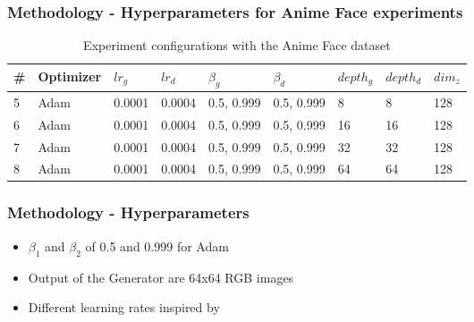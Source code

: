 \begin{frame}
    \frametitle{Methodology - Hyperparameters for Anime Face experiments}

    \begin{center}
        \begin{table}[H]
            \centering
            \tiny
            \begin{tabular}{@{}lllllllll@{}}
            \toprule
            \# & Optimizer & $ lr_{g} $ & $ lr_{d} $ & $ \beta_{g} $ & $ \beta_{d} $ & $ depth_{g} $ & $ depth_{d} $ & $ dim_{z} $ \\ \midrule
            5 & Adam & 0.0001 & 0.0004 & 0.5, 0.999 & 0.5, 0.999 & 8  & 8  & 128 \\
            6 & Adam & 0.0001 & 0.0004 & 0.5, 0.999 & 0.5, 0.999 & 16 & 16 & 128 \\
            7 & Adam & 0.0001 & 0.0004 & 0.5, 0.999 & 0.5, 0.999 & 32 & 32 & 128 \\
            8 & Adam & 0.0001 & 0.0004 & 0.5, 0.999 & 0.5, 0.999 & 64 & 64 & 128 \\ \bottomrule
            \end{tabular}
            \caption{Experiment configurations with the Anime Face dataset}
        \label{tab:experiments_anime_face}
        \end{table}

    \end{center}
\end{frame}

\begin{frame}
    \frametitle{Methodology - Hyperparameters}

    \begin{center}
        \begin{itemize}
            \item $ \beta_{1} $ and $ \beta_{2} $ of 0.5 and 0.999 for Adam
            \item Output of the Generator are 64x64 RGB images
            \item Different learning rates inspired by  \cite{heusel2018ttur}
        \end{itemize}
        
    \end{center}
\end{frame}